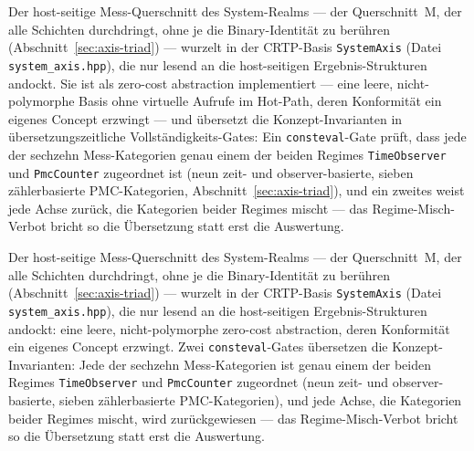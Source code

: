 \begin{nurlang}
Der host-seitige Mess-Querschnitt des System-Realms --- der Querschnitt~M, der alle Schichten
durchdringt, ohne je die Binary-Identität zu berühren (Abschnitt~\ref{sec:axis-triad}) --- wurzelt in der
CRTP-Basis \texttt{SystemAxis} (Datei \texttt{system\_axis.hpp}), die nur lesend an die host-seitigen
Ergebnis-Strukturen andockt. Sie ist als zero-cost abstraction implementiert --- eine leere, nicht-polymorphe
Basis ohne virtuelle Aufrufe im Hot-Path, deren Konformität ein eigenes Concept erzwingt --- und
übersetzt die Konzept-Invarianten in übersetzungszeitliche Vollständigkeits-Gates: Ein
\texttt{consteval}-Gate prüft, dass jede der sechzehn Mess-Kategorien genau einem der beiden Regimes
\texttt{TimeObserver} und \texttt{PmcCounter} zugeordnet ist (neun zeit- und observer-basierte, sieben
zählerbasierte PMC-Kategorien, Abschnitt~\ref{sec:axis-triad}), und ein zweites weist jede Achse zurück,
die Kategorien beider Regimes mischt --- das Regime-Misch-Verbot bricht so die Übersetzung statt erst die
Auswertung.
\end{nurlang}
\begin{nurkurz}
Der host-seitige Mess-Querschnitt des System-Realms --- der Querschnitt~M, der alle Schichten durchdringt,
ohne je die Binary-Identität zu berühren (Abschnitt~\ref{sec:axis-triad}) --- wurzelt in der CRTP-Basis
\texttt{SystemAxis} (Datei \texttt{system\_axis.hpp}), die nur lesend an die host-seitigen
Ergebnis-Strukturen andockt: eine leere, nicht-polymorphe zero-cost abstraction, deren Konformität ein
eigenes Concept erzwingt. Zwei \texttt{consteval}-Gates übersetzen die Konzept-Invarianten: Jede der
sechzehn Mess-Kategorien ist genau einem der beiden Regimes \texttt{TimeObserver} und \texttt{PmcCounter}
zugeordnet (neun zeit- und observer-basierte, sieben zählerbasierte PMC-Kategorien), und jede Achse, die
Kategorien beider Regimes mischt, wird zurückgewiesen --- das Regime-Misch-Verbot bricht so die
Übersetzung statt erst die Auswertung.
\end{nurkurz}

